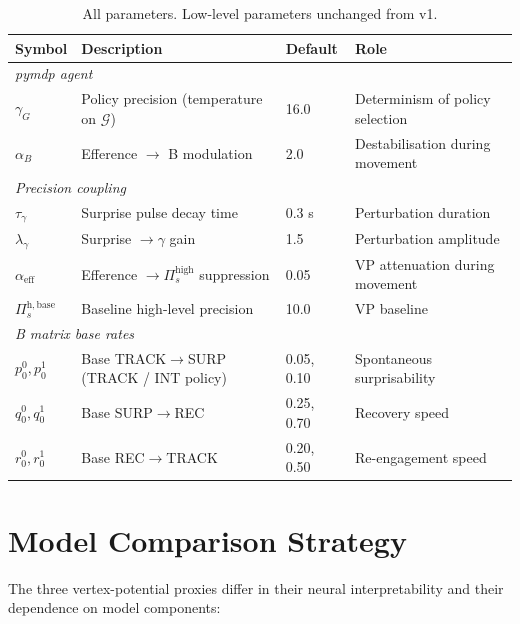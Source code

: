 \documentclass[11pt, a4paper]{article}
\newcommand{\EFE}{\mathcal{G}}
\newcommand{\Pish}{\Pi_s^{\mathrm{high}}}
\begin{document}
\begin{table}[ht]
\centering
\caption{All parameters. Low-level parameters unchanged from v1.}
\renewcommand{\arraystretch}{1.35}
\begin{tabular}{llll}
\toprule
\textbf{Symbol} & \textbf{Description} & \textbf{Default} & \textbf{Role}\\
\midrule
\multicolumn{4}{l}{\textit{pymdp agent}}\\
$\gamma_G$      & Policy precision (temperature on $\EFE$) & 16.0 & Determinism of policy selection\\
$\alpha_B$      & Efference $\to$ B modulation             & 2.0  & Destabilisation during movement\\
\multicolumn{4}{l}{\textit{Precision coupling}}\\
$\tau_\gamma$   & Surprise pulse decay time                & 0.3 s & Perturbation duration\\
$\lambda_\gamma$& Surprise $\to\gamma$ gain                & 1.5   & Perturbation amplitude\\
$\alpha_{\mathrm{eff}}$ & Efference $\to\Pish$ suppression & 0.05  & VP attenuation during movement\\
$\Pi_s^{\mathrm{h,base}}$ & Baseline high-level precision  & 10.0  & VP baseline\\
\multicolumn{4}{l}{\textit{B matrix base rates}}\\
$p_0^0, p_0^1$  & Base TRACK$\to$SURP (TRACK / INT policy) & 0.05, 0.10 & Spontaneous surprisability\\
$q_0^0, q_0^1$  & Base SURP$\to$REC                        & 0.25, 0.70 & Recovery speed\\
$r_0^0, r_0^1$  & Base REC$\to$TRACK                       & 0.20, 0.50 & Re-engagement speed\\
\bottomrule
\end{tabular}
\end{table}

\section{Model Comparison Strategy}

The three vertex-potential proxies differ in their neural interpretability
and their dependence on model components:
\end{document}
